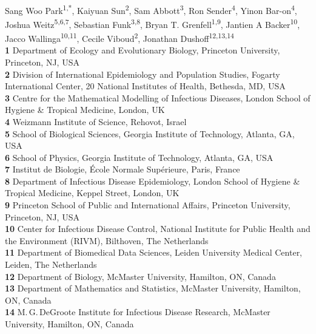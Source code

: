 \documentclass[12pt]{article}
\date{\today}
\begin{document}
\begin{flushleft}{
	\Large
	\textbf{}
}
\newline
\\
Sang Woo Park\textsuperscript{1,*},
Kaiyuan Sun\textsuperscript{2},
Sam Abbott\textsuperscript{3},
Ron Sender\textsuperscript{4},
Yinon Bar-on\textsuperscript{4},
Joshua Weitz\textsuperscript{5,6,7},
Sebastian Funk\textsuperscript{3,8}, 
Bryan T. Grenfell\textsuperscript{1,9},
Jantien A Backer\textsuperscript{10},
Jacco Wallinga\textsuperscript{10,11},
Cecile Viboud\textsuperscript{2},
Jonathan Dushoff\textsuperscript{12,13,14}
\\
\bigskip
\textbf{1} Department of Ecology and Evolutionary Biology, Princeton University, Princeton, NJ, USA
\\
\textbf{2} Division of International Epidemiology and Population Studies, Fogarty International Center, 20 National Institutes of Health, Bethesda, MD, USA
\\
\textbf{3} Centre for the Mathematical Modelling of Infectious Diseases, London School of Hygiene \& Tropical Medicine, London, UK
\\
\textbf{4} Weizmann Institute of Science, Rehovot, Israel
\\
\textbf{5} School of Biological Sciences, Georgia Institute of Technology, Atlanta, GA, USA
\\
\textbf{6} School of Physics, Georgia Institute of Technology, Atlanta, GA, USA
\\
\textbf{7} Institut de Biologie, \'{E}cole Normale Sup\'{e}rieure, Paris, France
\\
\textbf{8} Department of Infectious Disease Epidemiology, London School of Hygiene \& Tropical Medicine, Keppel Street, London, UK
\\
\textbf{9} Princeton School of Public and International Affairs, Princeton University, Princeton, NJ, USA
\\
\textbf{10} Center for Infectious Disease Control, National Institute for Public Health and the Environment (RIVM), Bilthoven, The Netherlands
\\
\textbf{11} Department of Biomedical Data Sciences, Leiden University Medical Center, Leiden, The Netherlands
\\
\textbf{12} Department of Biology, McMaster University, Hamilton, ON, Canada
\\
\textbf{13} Department of Mathematics and Statistics, McMaster University, Hamilton, ON, Canada
\\
\textbf{14} M.\,G.\,DeGroote Institute for Infectious Disease Research, McMaster University, Hamilton, ON, Canada
\\
\bigskip


\end{flushleft}
\end{document}
